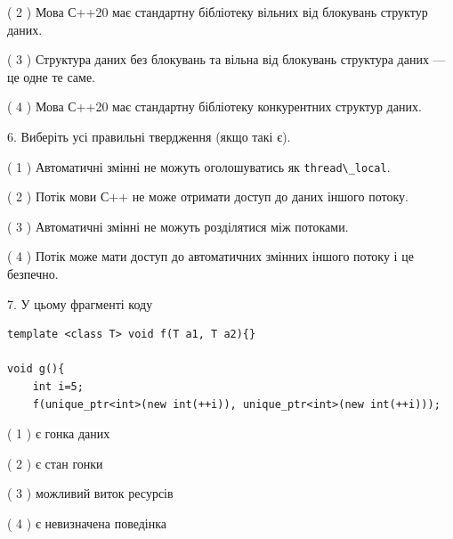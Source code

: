 \documentclass[12pt, ukrainian]{article}
\def\code#1{\Verb!#1!}
\begin{document}
\begin {large}
{( 2 ) Мова С++20 має стандартну бібліотеку вільних від блокувань структур даних.%

( 3 ) Структура даних без блокувань та вільна від блокувань структура даних --- це одне те саме.%

( 4 ) Мова С++20 має стандартну бібліотеку конкурентних структур даних.%
\newpage



\vspace{5mm}
6. Виберіть усі правильні твердження (якщо такі є).\par
\vspace{2mm}

( 1 ) Автоматичні змінні не можуть оголошуватись як \code{thread\_local}.%

( 2 ) Потік мови С++ не може отримати доступ до даних іншого потоку.%

( 3 ) Автоматичні змінні не можуть розділятися між потоками.%

( 4 ) Потік може мати доступ до автоматичних змінних іншого потоку і це безпечно.%


\vspace{5mm}
7. У цьому фрагменті коду
\begin{verbatim}
template <class T> void f(T a1, T a2){}

void g(){
    int i=5;
    f(unique_ptr<int>(new int(++i)), unique_ptr<int>(new int(++i)));
\end{verbatim}

( 1 ) є гонка даних%

( 2 ) є стан гонки%

( 3 ) можливий виток ресурсів%

( 4 ) є невизначена поведінка%
}
\end {large}
\end{document}
